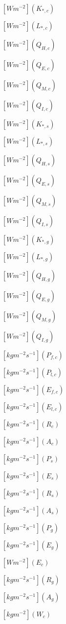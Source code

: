 \documentclass{article}
\begin{document}
$[W m^{-2}] (K_{*,c})$
\pagebreak

$[W m^{-2}] (L_{*,c})$
\pagebreak

$[W m^{-2}] (Q_{H,c})$
\pagebreak

$[W m^{-2}] (Q_{E,c})$
\pagebreak

$[W m^{-2}] (Q_{M,c})$
\pagebreak

$[W m^{-2}] (Q_{I,c})$
\pagebreak

$[W m^{-2}] (K_{*,s})$
\pagebreak

$[W m^{-2}] (L_{*,s})$
\pagebreak

$[W m^{-2}] (Q_{H,s})$
\pagebreak

$[W m^{-2}] (Q_{E,s})$
\pagebreak

$[W m^{-2}] (Q_{M,s})$
\pagebreak

$[W m^{-2}] (Q_{I,s})$
\pagebreak

$[W m^{-2}] (K_{*,g})$
\pagebreak

$[W m^{-2}] (L_{*,g})$
\pagebreak

$[W m^{-2}] (Q_{H,g})$
\pagebreak

$[W m^{-2}] (Q_{E,g})$
\pagebreak

$[W m^{-2}] (Q_{M,g})$
\pagebreak

$[W m^{-2}] (Q_{I,g})$
\pagebreak

$[kg m^{-2} s^{-1}] (P_{f,c})$
\pagebreak

$[kg m^{-2} s^{-1}] (P_{l,c})$
\pagebreak

$[kg m^{-2} s^{-1}] (E_{f,c})$
\pagebreak

$[kg m^{-2} s^{-1}] (E_{l,c})$
\pagebreak

$[kg m^{-2} s^{-1}] (R_c)$
\pagebreak

$[kg m^{-2} s^{-1}] (A_c)$
\pagebreak

$[kg m^{-2} s^{-1}] (P_s)$
\pagebreak

$[kg m^{-2} s^{-1}] (E_s)$
\pagebreak

$[kg m^{-2} s^{-1}] (R_s)$
\pagebreak

$[kg m^{-2} s^{-1}] (A_s)$
\pagebreak

$[kg m^{-2} s^{-1}] (P_g)$
\pagebreak

$[kg m^{-2} s^{-1}] (E_g)$
\pagebreak

$[W m^{-2}] (E_c)$
\pagebreak

$[kg m^{-2} s^{-1}] (R_g)$
\pagebreak

$[kg m^{-2} s^{-1}] (A_g)$
\pagebreak

$[kg m^{-2}] (W_c)$
\pagebreak
\end{document}
